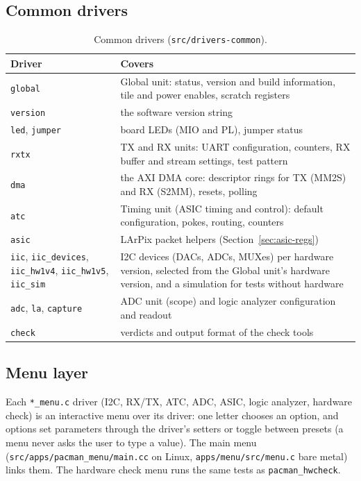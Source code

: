 \documentclass[12pt]{article}
\newcommand{\f}[1]{\texttt{#1}}
\begin{document}
\subsection{Common drivers}

\begin{table}[H]
\centering\small
\begin{tabularx}{\linewidth}{lL}
\toprule
Driver & Covers \\
\midrule
\f{global} & Global unit:  status, version and build information, tile and power enables, scratch
  registers \\
\f{version} & the software version string \\
\f{led}, \f{jumper} & board LEDs (MIO and PL), jumper status \\
\f{rxtx} & TX and RX units:  UART configuration, counters, RX buffer and stream settings, test
  pattern \\
\f{dma} & the AXI DMA core:  descriptor rings for TX (MM2S) and RX (S2MM), resets, polling \\
\f{atc} & Timing unit (ASIC timing and control):  default configuration, pokes, routing,
  counters \\
\f{asic} & LArPix packet helpers (Section~\ref{sec:asic-regs}) \\
\f{iic}, \f{iic\_devices}, \f{iic\_hw1v4}, \f{iic\_hw1v5}, \f{iic\_sim} & I2C devices (DACs, ADCs,
  MUXes) per hardware version, selected from the Global unit's hardware version, and a simulation
  for tests without hardware \\
\f{adc}, \f{la}, \f{capture} & ADC unit (scope) and logic analyzer configuration and readout \\
\f{check} & verdicts and output format of the check tools \\
\bottomrule
\end{tabularx}
\caption{Common drivers (\f{src/drivers-common}).}
\label{tbl:common}
\end{table}

\subsection{Menu layer}

Each \f{*\_menu.c} driver (I2C, RX/TX, ATC, ADC, ASIC, logic analyzer, hardware check) is an
interactive menu over its driver:  one letter chooses an option, and options set parameters through
the driver's setters or toggle between presets (a menu never asks the user to type a value).  The
main menu (\f{src/apps/pacman\_menu/main.cc} on Linux, \f{apps/menu/src/menu.c} bare metal) links
them.  The hardware check menu runs the same tests as \f{pacman\_hwcheck}.
\end{document}
